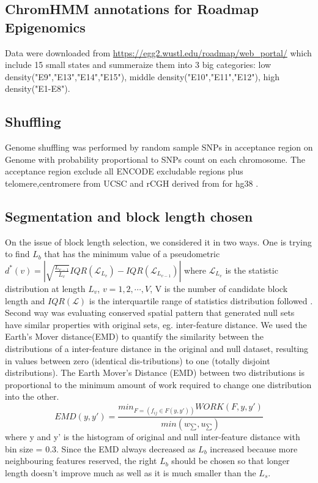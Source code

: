 \documentclass{article}
\begin{document}
\subsection{ChromHMM annotations for Roadmap Epigenomics}
Data were downloaded from \url{https://egg2.wustl.edu/roadmap/web_portal/} which include 15 small states and summeraize them into 3 big categories: low density("E9","E13","E14","E15"), middle density("E10","E11","E12"), high density("E1-E8"). 

\subsection{Shuffling}\label{sec:shuffle}
Genome shuffling was performed by random sample SNPs in acceptance region on Genome with probability proportional to SNPs count on each chromosome. The acceptance region exclude all ENCODE excludable regions plus telomere,centromere from UCSC and rCGH derived from  for hg38 \citep{excluderanges}.

\subsection{Segmentation and block length chosen}
On the issue of 
block length selection, we considered it in two ways. One is trying to find $L_b$ that has the minimum value of a pseudometric $d^*(v)=|\sqrt{\frac{L_{v-1}}{L_v}}IQR(\mathcal{L}_{L_v})-IQR(\mathcal{L}_{L_{v-1}})|$ where $\mathcal{L}_{L_v}$ is the statistic distribution at length $L_v$, $v=1,2,\cdots,V$, V is the number of candidate block length and $IQR(\mathcal{L})$ is the interquartile range of statistics distribution followed \citet{bickel2010subsampling}.
Second way was evaluating conserved spatial pattern that generated null sets have similar properties with original sets, eg. inter-feature distance. We used the Earth's Mover distance(EMD) to quantify the similarity between the distributions of a inter-feature distance in the original  and  null  dataset,  resulting  in  values  between  zero  (identical  dis-tributions)  to  one  (totally  disjoint  distributions). The Earth Mover's Distance (EMD) between two distributions is proportional to the minimum amount of work required to change one distribution into the other. $$EMD(y,y') = \frac{min_{F=(f_{ij}\in \mathcal{}F(y,y'))} WORK(F,y,y')}{min(w_{\sum},u_{\sum})}$$ where y and y' is the histogram of original and null inter-feature distance with bin size = 0.3. Since the EMD always decreased as $L_b$ increased because more neighbouring features reserved, the right $L_b$ should be chosen so that longer length doesn’t improve much as well as it is much smaller than the $L_s$.
\end{document}
